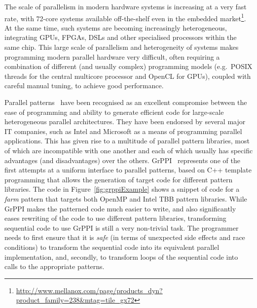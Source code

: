 \noindent
The scale of parallelism in modern hardware systems is increasing at a very fast rate, with 72-core systems available off-the-shelf even in the embedded market\footnote{\url{http://www.mellanox.com/page/products_dyn?product_family=238&mtag=tile_gx72}}. At the same time, such systems are becoming increasingly heterogeneous, integrating GPUs, FPGAs, DSLs and other specialised processors within the same chip. This large scale of parallelism and heterogeneity of systems makes programming modern parallel hardware very difficult, often requiring a combination of different (and usually complex) programming models (e.g.~POSIX threads for the central multicore processor and OpenCL for GPUs), coupled with careful manual tuning, to achieve good performance. 

Parallel patterns~\cite{Asanovic:2009:VPC} have been recognised as an excellent compromise between the ease of programming and ability to generate efficient code for large-scale heterogeneous parallel architectures. They have been endorsed by several major IT companies, such as Intel and Microsoft as a means of programming parallel applications. This has given rise to a multitude of parallel pattern libraries, most of which are incompatible with one another and each of which usually has specific advantages (and disadvantages) over the others. GrPPI~\cite{DBLP:journals/concurrency/AstorgaD0G17} represents one of the first attempts at a uniform interface to parallel patterns, based on C++ template programming that allows the generation of target code for different pattern libraries. The code in Figure~\ref{fig:grppiExample} shows a snippet of code for a \emph{farm} pattern that targets both OpenMP and Intel TBB pattern libraries. While GrPPI makes the patterned code much easier to write, and also significantly eases rewriting of the code to use different pattern libraries, transforming sequential code to use GrPPI is still a very non-trivial task. The programmer needs to first ensure that it is \emph{safe} (in terms of unexpected side effects and race conditions) to transform the sequential code into its equivalent parallel implementation, and, secondly, to transform loops of the sequential code into calls to the appropriate patterns. 

